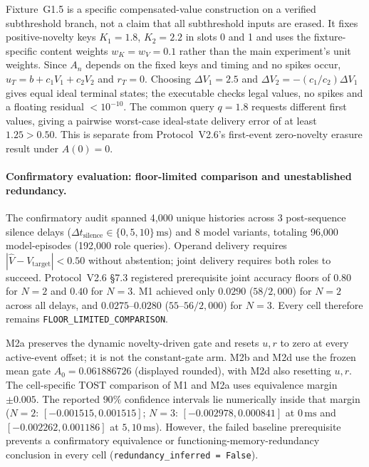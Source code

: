 Fixture~G1.5 is a specific compensated-value construction on a verified
subthreshold branch, not a claim that all subthreshold inputs are erased.
It fixes positive-novelty keys $K_1=1.8$, $K_2=2.2$ in slots 0 and 1
and uses the fixture-specific content weights $w_K=w_V=0.1$ rather than
the main experiment's unit weights. Since $A_n$ depends on the fixed keys
and timing and no spikes occur, $u_T=b+c_1V_1+c_2V_2$ and $r_T=0$.
Choosing $\Delta V_1=2.5$ and
$\Delta V_2=-(c_1/c_2)\Delta V_1$ gives equal ideal terminal states;
the executable checks legal values, no spikes and a floating residual
$<10^{-10}$. The common query $q=1.8$ requests different first values,
giving a pairwise worst-case ideal-state delivery error of at least
$1.25>0.50$. This is separate from Protocol~V2.6's first-event
zero-novelty erasure result under $A(0)=0$.

\paragraph{Confirmatory evaluation: floor-limited comparison and unestablished redundancy.}
The confirmatory audit spanned 4,000 unique histories across 3 post-sequence silence
delays ($\Delta t_{\text{silence}}\in\{0,5,10\}\,\text{ms}$) and 8 model variants,
totaling 96,000 model-episodes (192,000 role queries). Operand delivery requires
$|\hat V-V_{\mathrm{target}}|<0.50$ without abstention; joint delivery requires
both roles to succeed. Protocol~V2.6 \S7.3 registered prerequisite joint
accuracy floors of $0.80$ for $N=2$ and $0.40$ for $N=3$.
M1 achieved only $0.0290$ ($58/2{,}000$) for $N=2$ across all delays, and
$0.0275$--$0.0280$ ($55$--$56/2{,}000$) for $N=3$.
Every cell therefore remains \texttt{FLOOR\_LIMITED\_COMPARISON}.

M2a preserves the dynamic novelty-driven gate and resets $u,r$ to zero
at every active-event offset; it is not the constant-gate arm.
M2b and M2d use the frozen mean gate $A_0=0.061886726$ (displayed rounded),
with M2d also resetting $u,r$. The cell-specific TOST comparison of
M1 and M2a uses equivalence margin $\pm0.005$. The reported $90\%$
confidence intervals lie numerically
inside that margin ($N=2$: $[-0.001515,0.001515]$;
$N=3$: $[-0.002978,0.000841]$ at $0\,\text{ms}$ and
$[-0.002262,0.001186]$ at $5,10\,\text{ms}$).
However, the failed baseline prerequisite prevents a confirmatory
equivalence or functioning-memory-redundancy conclusion in every cell
(\texttt{redundancy\_inferred = False}).

